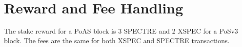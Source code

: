 \section{Reward and Fee Handling}
The stake reward for a PoAS block is 3 SPECTRE and 2 XSPEC for a PoSv3 block.
The fees are the same for both XSPEC and SPECTRE transactions.